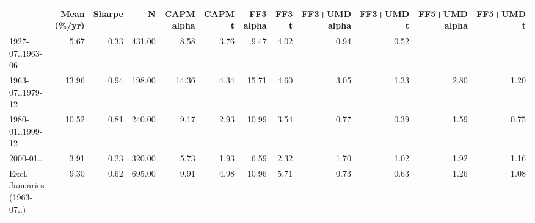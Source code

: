 \begin{tabular}{lrrrrrrrrrrr}
\toprule
 & Mean (\%/yr) & Sharpe & N & CAPM alpha & CAPM t & FF3 alpha & FF3 t & FF3+UMD alpha & FF3+UMD t & FF5+UMD alpha & FF5+UMD t \\
\midrule
1927-07..1963-06 & 5.67 & 0.33 & 431.00 & 8.58 & 3.76 & 9.47 & 4.02 & 0.94 & 0.52 &  &  \\
1963-07..1979-12 & 13.96 & 0.94 & 198.00 & 14.36 & 4.34 & 15.71 & 4.60 & 3.05 & 1.33 & 2.80 & 1.20 \\
1980-01..1999-12 & 10.52 & 0.81 & 240.00 & 9.17 & 2.93 & 10.99 & 3.54 & 0.77 & 0.39 & 1.59 & 0.75 \\
2000-01.. & 3.91 & 0.23 & 320.00 & 5.73 & 1.93 & 6.59 & 2.32 & 1.70 & 1.02 & 1.92 & 1.16 \\
Excl. Januaries (1963-07..) & 9.30 & 0.62 & 695.00 & 9.91 & 4.98 & 10.96 & 5.71 & 0.73 & 0.63 & 1.26 & 1.08 \\
\bottomrule
\end{tabular}
